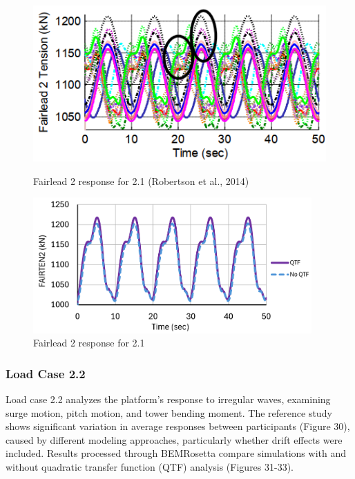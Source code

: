 \documentclass[a4paper, 11pt]{article}
\begin{document}
\begin{figure}[H]
    \begin{minipage}{0.48\textwidth}
        \centering
        \includegraphics[width=1\textwidth]{2.1_fairten2.png}
        \caption{\small Fairlead 2 response for 2.1 (Robertson et al., 2014)}
        \label{fig:2.1_fairten2}
    \end{minipage}
    \hfill
    \begin{minipage}{0.51\textwidth}
        \centering
        \vspace{-0.3cm}
        \includegraphics[width=0.95\textwidth]{2.1_fairten2_mine.png}
        \caption{\small Fairlead 2 response for 2.1}
        \label{fig:2.1_fairten2_mine}
    \end{minipage}
\end{figure}

\subsubsection{Load Case 2.2}

\hspace{0.5cm}Load case 2.2 analyzes the platform's response to irregular waves, examining surge motion, pitch motion, and tower bending moment. The reference study shows significant variation in average responses between participants (Figure 30), caused by different modeling approaches, particularly whether drift effects were included. Results processed through BEMRosetta compare simulations with and without quadratic transfer function (QTF) analysis (Figures 31-33).
\end{document}
